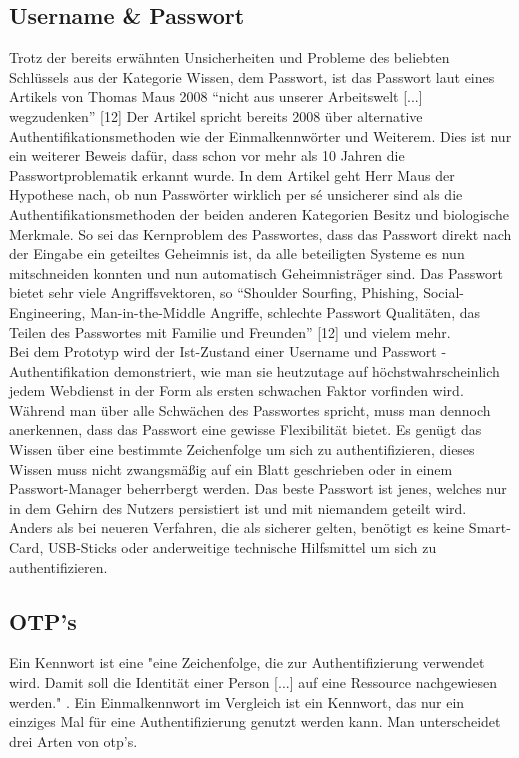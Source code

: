 \subsection{Username \& Passwort}
Trotz der bereits erwähnten Unsicherheiten und Probleme des beliebten Schlüssels aus der Kategorie Wissen, dem Passwort, ist das Passwort laut eines Artikels von Thomas Maus 2008 ``nicht aus unserer Arbeitswelt [...] wegzudenken'' [12] Der Artikel spricht bereits 2008 über alternative Authentifikationsmethoden wie der Einmalkennwörter und Weiterem. Dies ist nur ein weiterer Beweis dafür, dass schon vor mehr als 10 Jahren die Passwortproblematik erkannt wurde. In dem Artikel geht Herr Maus der Hypothese nach, ob nun Passwörter wirklich per sé unsicherer sind als die Authentifikationsmethoden der beiden anderen Kategorien Besitz und biologische Merkmale. So sei das Kernproblem des Passwortes, dass das Passwort direkt nach der Eingabe ein geteiltes Geheimnis ist, da alle beteiligten Systeme es nun mitschneiden konnten und nun automatisch Geheimnisträger sind. Das Passwort bietet sehr viele Angriffsvektoren, so ``Shoulder Sourfing, Phishing, Social-Engineering, Man-in-the-Middle Angriffe, schlechte Passwort Qualitäten, das Teilen des Passwortes mit Familie und Freunden'' [12] und vielem mehr. \\
Bei dem Prototyp wird der Ist-Zustand einer Username und Passwort - Authentifikation demonstriert, wie man sie heutzutage auf höchstwahrscheinlich jedem Webdienst in der Form als ersten schwachen Faktor vorfinden wird. Während man über alle Schwächen des Passwortes spricht, muss man dennoch anerkennen, dass das Passwort eine gewisse Flexibilität bietet. Es genügt das Wissen über eine bestimmte Zeichenfolge um sich zu authentifizieren, dieses Wissen muss nicht zwangsmäßig auf ein Blatt geschrieben oder in einem Passwort-Manager beherrbergt werden. Das beste Passwort ist jenes, welches nur in dem Gehirn des Nutzers persistiert ist und mit niemandem geteilt wird. Anders als bei neueren Verfahren, die als sicherer gelten, benötigt es keine Smart-Card, USB-Sticks oder anderweitige technische Hilfsmittel um sich zu authentifizieren.

\subsection{OTP's}
Ein Kennwort ist eine "eine Zeichenfolge, die zur Authentifizierung verwendet wird. Damit soll die Identität einer Person [...] auf eine Ressource nachgewiesen werden." \cite{A4}. Ein Einmalkennwort im Vergleich ist ein Kennwort, das nur ein einziges Mal für eine Authentifizierung genutzt werden kann. Man unterscheidet drei Arten von \ac{otp}'s.

